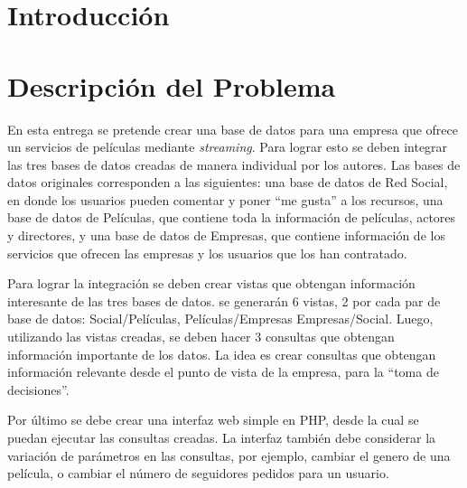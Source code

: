 \documentclass[12pt,letterpaper]{article}
\begin{document}

\newpage
\pagestyle{fancy}
\headheight=60pt 					
\fancyhead[R]
{}
\setcounter{page}{1}
\tableofcontents

\newpage

\section{Introducción}

\section{Descripción del Problema}

En esta entrega se pretende crear una base de datos para una empresa que ofrece un servicios de películas mediante \emph{streaming}. Para lograr esto se deben integrar las tres bases de datos creadas de manera individual por los autores. Las bases de datos originales corresponden a las siguientes: una base de datos de Red Social, en donde los usuarios pueden comentar y poner ``me gusta'' a los recursos, una base de datos de Películas, que contiene toda la información de películas, actores y directores, y una base de datos de Empresas, que contiene información de los servicios que ofrecen las empresas y los usuarios que los han contratado.

Para lograr la integración se deben crear vistas que obtengan información interesante de las tres bases de datos. se generarán 6 vistas, 2 por cada par de base de datos: Social/Películas, Películas/Empresas Empresas/Social. Luego, utilizando las vistas creadas, se deben hacer 3 consultas que obtengan información importante de los datos. La idea es crear consultas que obtengan información relevante desde el punto de vista de la empresa, para la ``toma de decisiones''.

Por último se debe crear una interfaz web simple en PHP, desde la cual se puedan ejecutar las consultas creadas. La interfaz también debe considerar la variación de parámetros en las consultas, por ejemplo, cambiar el genero de una película, o cambiar el número de seguidores pedidos para un usuario. 
\end{document}
